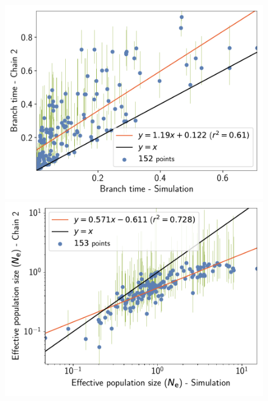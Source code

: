 \documentclass{article}
\begin{document}
\begin{figure}[H]
\begin{minipage}{0.32\linewidth}
			\includegraphics[width=\linewidth, page=1]{simulations/SimuGeo_SiteMutSelBranchNe_BranchCorrelation_BranchTime}
		\end{minipage} \hfill
		\begin{minipage}{0.32\linewidth}
			\includegraphics[width=\linewidth, page=1]{simulations/SimuGeo_SiteMutSelBranchNe_BranchCorrelation_LogPopulationSize}
		\end{minipage}
		\begin{minipage}{0.32\linewidth}

\end{minipage}
\end{figure}
\end{document}
